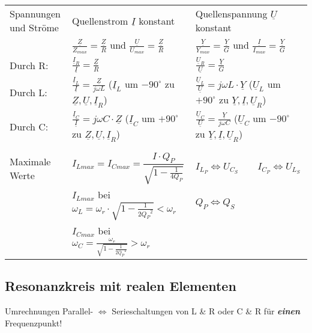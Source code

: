 \begin{tabular}{| p{4cm} | p{7.0cm} | p{7.0cm} |}
  	\hline
  Spannungen und Ströme 
    & Quellenstrom $\underline{I}$ konstant
    & Quellenspannung $\underline{U}$ konstant \\
   	& $\frac{\underline{Z}}{Z_{max}} = \frac{\underline{Z}}{R}$ und $ \frac{\underline{U}}{U_{max}} = \frac{\underline{Z}}{R}$
   	& $\frac{\underline{Y}}{Y_{max}} = \frac{\underline{Y}}{G}$ und $ \frac{\underline{I}}{I_{max}} = \frac{\underline{Y}}{G}$\\
   \hfill Durch R: 
   	& $\frac{\underline{I}_R}{\underline{I}}  = \frac{\underline{Z}}{R}$ 
   	& $\frac{\underline{U}_R}{\underline{U}}  = \frac{\underline{Y}}{G}$ \\
   \hfill Durch L:
    & $ \frac{\underline{I}_L}{\underline{I}} = \frac{\underline{Z}}{j\omega L}$  ($\underline{I}_L$ um $-90^\circ$ zu $\underline{Z}, \underline{U}, \underline{I}_R$)
    & $ \frac{\underline{U}_L}{\underline{U}} = j \omega L \cdot \underline{Y}$ ($\underline{U}_L$ um $+90^\circ$ zu $\underline{Y}, \underline{I}, \underline{U}_R$)\\
   \hfill Durch C:
    & $ \frac{\underline{I}_C}{\underline{I}} = j \omega C \cdot \underline{Z}$ ($\underline{I}_C$ um $+90^\circ$ zu $\underline{Z}, \underline{U}, \underline{I}_R$) 
    & $ \frac{\underline{U}_C}{\underline{U}} = \frac{\underline{Y}}{j\omega C}$ ($\underline{U}_C$ um $-90^\circ$ zu $\underline{Y}, \underline{I}, \underline{U}_R$)\\
    & \parbox[l]{3cm}{
    	\scalebox{0.8}{}}
    & \begin{minipage}[c]{5cm}
    	Bei $\omega = \omega_1$:\\
   		
   	  \end{minipage}\\
   	Maximale Werte 
   	& $I_{Lmax}=I_{Cmax}=\dfrac{I\cdot 	Q_P}{\sqrt{1-\frac{1}{4Q_P}}}$
   	& $I_{L_P} \Leftrightarrow U_{C_S} \qquad I_{C_P} \Leftrightarrow U_{L_S}$ \\
   	& $I_{Lmax}$ bei $\omega_L = \omega_r\cdot\sqrt{1-\frac{1}{2{Q_P}^2}} < \omega_r$
   	& $Q_P \Leftrightarrow Q_S$\\
   	& $I_{Cmax}$ bei $\omega_C = \frac{\omega_r}{\sqrt{1-\frac{1}{2{Q_P}^2}}} > \omega_r$\\

   	\hline
  \end{tabular}	

\subsection{Resonanzkreis mit realen Elementen}
	Umrechnungen Parallel- $\Longleftrightarrow$ Serieschaltungen von L \& R oder C
	\& R für \textbf{\textit{einen}} Frequenzpunkt!\\
	

